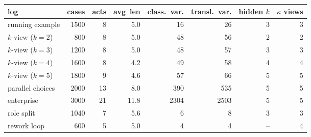 \begin{tabular}{lrrrrrr|r}
\toprule
log & cases & acts & avg\ len & class.\ var. & transl.\ var. & hidden $k$ & $\kappa$ views \\
\midrule
running example & 1500 & 8 & 5.0 & 16 & 26 & 3 & 3 \\
$k$-view ($k{=}2$) & 800 & 8 & 5.0 & 48 & 56 & 2 & 2 \\
$k$-view ($k{=}3$) & 1200 & 8 & 5.0 & 48 & 57 & 3 & 3 \\
$k$-view ($k{=}4$) & 1600 & 8 & 4.2 & 49 & 58 & 4 & 4 \\
$k$-view ($k{=}5$) & 1800 & 9 & 4.6 & 57 & 66 & 5 & 5 \\
parallel choices & 2000 & 13 & 8.0 & 390 & 535 & 5 & 5 \\
enterprise & 3000 & 21 & 11.8 & 2304 & 2503 & 5 & 5 \\
role split & 1040 & 7 & 5.6 & 6 & 8 & 3 & 3 \\
rework loop & 600 & 5 & 5.0 & 4 & 4 & -- & 4 \\
\bottomrule
\end{tabular}
